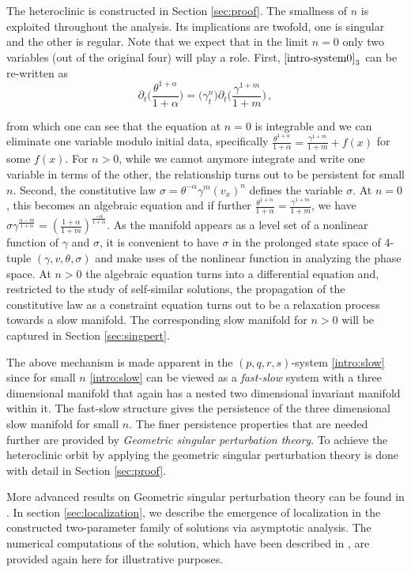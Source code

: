 \documentclass[a4paper,11pt]{article}
\def\blue{\color{blue}}
\theoremstyle{remark}
\begin{document}
The heteroclinic is constructed in Section \ref{sec:proof}.
The smallness of $n$ is exploited throughout the analysis. Its implications are twofold, one is singular and the other is regular. 
Note that we expect that in the limit $n=0$ only two variables (out of the original four) will play a role.
First, $\eqref{intro-system0}_3$ {\blue can be re-written as}
$$ \partial_t\Big(\frac{\theta^{1+\alpha}}{1+\alpha}\Big) = \big(\gamma_t^n\big)\partial_t\Big(\frac{\gamma^{1+m}}{1+m}\Big) \, , $$
{\blue from which one can see that the equation at $n=0$ is integrable and we can eliminate one variable modulo initial data, specifically $\frac{\theta^{1+\alpha}}{1+\alpha} = \frac{\gamma^{1+m}}{1+m} + f(x)$ for some $f(x)$. For $n>0$, while we cannot anymore integrate and write one variable in terms of the other, the relationship turns out to be persistent for small $n$.
Second, the constitutive law 
$\sigma=\theta^{-\alpha}\gamma^m(v_x)^n$ defines the variable $\sigma$. At $n=0$, this becomes an algebraic equation and if further $\frac{\theta^{1+\alpha}}{1+\alpha} = \frac{\gamma^{1+m}}{1+m}$, we have $\sigma\gamma^{\tfrac{\alpha-m}{1+\alpha}}=\left(\tfrac{1+\alpha}{1+m}\right)^{\tfrac{-\alpha}{1+\alpha}} $. As the manifold appears as a level set of a nonlinear function of $\gamma$ and $\sigma$, it is convenient to have $\sigma$ in the prolonged state space of 4-tuple $(\gamma,v,\theta,\sigma)$ and make uses of the nonlinear function in analyzing the phase space. At $n>0$ the algebraic equation turns into a differential equation and, restricted to the study of self-similar solutions, the propagation of the constitutive law as a constraint equation turns out to be a relaxation process towards a slow manifold. The corresponding slow manifold for $n>0$ will be captured in Section \ref{sec:singpert}. 

The above mechanism is made apparent in the $(p,q,r,s)$-system \eqref{intro:slow} since for small $n$ \eqref{intro:slow} can be viewed as a {\it fast-slow} system with a three dimensional manifold that again has a nested two dimensional invariant manifold within it. The fast-slow structure gives the persistence of the three dimensional slow manifold for small $n$. The finer persistence properties that are needed further are provided by {\it Geometric singular perturbation theory}. To achieve the heteroclinic orbit by applying the geometric singular perturbation theory is done with detail in Section \ref{sec:proof}. }More advanced results on Geometric singular perturbation theory can be found in \cite{fenichel_asymptotic_1974, fenichel_asymptotic_1977,fenichel_geometric_1979,HPS_1977,Sz1991,wiggins_normally_1994,Jones_1995,KUEHN_2015}.
In section \ref{sec:localization}, we describe the emergence of localization in the constructed two-parameter family of solutions via asymptotic analysis. The numerical computations of the solution, which have been described in \cite{KLT_HYP2016}, are provided again here for illustrative purposes. 
\end{document}
